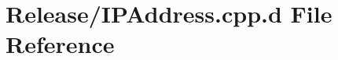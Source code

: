 \hypertarget{_release_2_i_p_address_8cpp_8d}{\section{\-Release/\-I\-P\-Address.cpp.\-d \-File \-Reference}
\label{_release_2_i_p_address_8cpp_8d}
}
